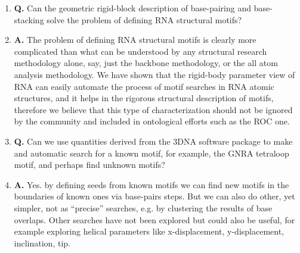 \begin{enumerate}
\item{\textbf{Q.}  Can   the  geometric  rigid-block   description  of
  base-pairing  and base-stacking  solve the  problem of  defining RNA
  structural motifs?}
\item{\textbf{A.}  The  problem of  defining RNA structural  motifs is
  clearly  more  complicated  than  what  can  be  understood  by  any
  structural  research  methodology  alone,  say,  just  the  backbone
  methodology, or  the all atom  analysis methodology.  We  have shown
  that the  rigid-body parameter view  of RNA can easily  automate the
  process of motif searches in  RNA atomic structures, and it helps in
  the rigorous structural description  of motifs, therefore we believe
  that  this type  of characterization  should not  be ignored  by the
  community and included in ontological efforts such as the ROC one.}
\item{\textbf{Q.} Can we use quantities derived from the 3DNA software
  package to make and automatic search for a known motif, for example,
  the GNRA tetraloop motif, and perhaps find unknown motifs?}
\item{\textbf{A.} Yes. by defining seeds from known motifs we can find
new motifs in  the boundaries of known ones  via base-pairs steps. But
we  can also  do  other,  yet simpler,  not  as ``precise''  searches,
e.g. by clustering  the results of base overlaps.  Other searches have
not  been explored  but could  also be  useful, for  example exploring
helical  parameters like x-displacement,  y-displacement, inclination,
tip.} 
\end{enumerate}




